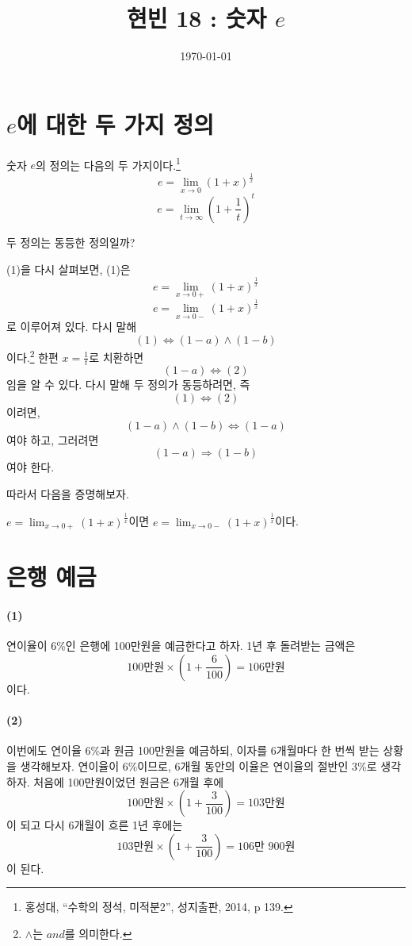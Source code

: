 \documentclass{article}
\begin{document}
\title{현빈 18 : 숫자 \(e\)}
\author{}
\date{\today}
\maketitle

\newpage

\section{\(e\)에 대한 두 가지 정의}
숫자 \(e\)의 정의는 다음의 두 가지이다.\footnote{홍성대, ``수학의 정석, 미적분2'', 성지출판, 2014, p 139.}
\begin{equation}e=\lim_{x\to0}\left(1+x\right)^{\frac1x}\end{equation}
\begin{equation}e=\lim_{t\to\infty}\left(1+\frac1t\right)^t\end{equation}

두 정의는 동등한 정의일까?

(1)을 다시 살펴보면, (1)은
\[e=\lim_{x\to0+}\left(1+x\right)^{\frac1x}\tag{1-a}\]
\[e=\lim_{x\to0-}\left(1+x\right)^{\frac1x}\tag{1-b}\]
로 이루어져 있다.
다시 말해
\[(1)\iff (1-a)\wedge(1-b)\]
이다.\footnote{\(\wedge\)는 \(and\)를 의미한다.}
한편 \(x=\frac1t\)로 치환하면
\[(1-a)\iff (2)\]
임을 알 수 있다.
다시 말해 두 정의가 동등하려면, 즉 \[(1)\iff(2)\]이려면,\[(1-a)\wedge(1-b)\iff(1-a)\]여야 하고,
그러려면 \[(1-a)\Rightarrow(1-b)\]여야 한다.

따라서 다음을 증명해보자.
\begin{mdframed}[skipabove=3pt]
\center\(\displaystyle e=\lim_{x\to0+}\left(1+x\right)^{\frac1x}\)이면 \(\displaystyle e=\lim_{x\to0-}\left(1+x\right)^{\frac1x}\)이다.
\end{mdframed}

\newpage

\section{은행 예금}

\paragraph{(1)}
연이율이 6\%인 은행에 100만원을 예금한다고 하자.
1년 후 돌려받는 금액은
\[100\text{만원}\times\left(1+\frac6{100}\right)=106\text{만원}\]
이다.

\paragraph{(2)}
이번에도 연이율 6\%과 원금 100만원을 예금하되, 이자를 6개월마다 한 번씩 받는 상황을 생각해보자.
연이율이 6\%이므로, 6개월 동안의 이율은 연이율의 절반인 3\%로 생각하자.
처음에 100만원이었던 원금은 6개월 후에
\[100\text{만원}\times\left(1+\frac3{100}\right)=103\text{만원}\]
이 되고 다시 6개월이 흐른 1년 후에는 
\[103\text{만원}\times\left(1+\frac3{100}\right)=106\text{만 }900\text{원}\]
이 된다.
\end{document}
